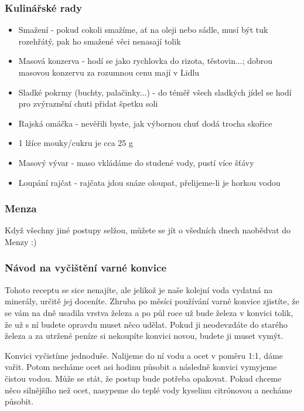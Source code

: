 \subsubsection*{Kulinářské rady}
\begin{itemize}
    \item Smažení - pokud cokoli smažíme, ať na oleji nebo sádle, musí být tuk rozehřátý, pak ho smažené věci nenasají tolik
    \item Masová konzerva - hodí se jako rychlovka do rizota, těstovin...; dobrou masovou konzervu za rozumnou cenu mají v Lidlu
    \item Sladké pokrmy (buchty, palačinky...) - do téměř všech sladkých jídel se hodí pro zvýraznění chuti přidat špetku soli
    \item Rajská omáčka - nevěřili byste, jak výbornou chuť dodá trocha skořice
    \item 1 lžíce mouky/cukru je cca 25 g
    \item Masový vývar - maso vkládáme do studené vody, pustí více šťávy
    \item Loupání rajčat - rajčata jdou snáze oloupat, přelijeme-li je horkou vodou
\end{itemize}

\subsubsection*{Menza}
Když všechny jiné postupy selžou, můžete se jít o všedních dnech naobědvat do Menzy :)

\subsubsection*{Návod na vyčištění varné konvice}
Tohoto receptu se sice nenajíte, ale jelikož je naše kolejní voda vydatná na minerály, určitě jej doceníte. Zhruba po měsíci používání varné konvice zjistíte, že se vám na dně usadila vrstva železa a po půl roce už bude železa v konvici tolik, že už s ní budete opravdu muset něco udělat. Pokud ji neodevzdáte do starého železa a za utržené peníze si nekoupíte konvici novou, budete ji muset vymýt.

Konvici vyčistíme jednoduše. Nalijeme do ní vodu a ocet v poměru 1:1, dáme vařit. Potom necháme ocet asi hodinu působit a následně konvici vymyjeme čistou vodou. Může se stát, že postup bude potřeba opakovat. Pokud chceme něco silnějšího než ocet, nasypeme do teplé vody kyselinu citrónovou a necháme působit.
